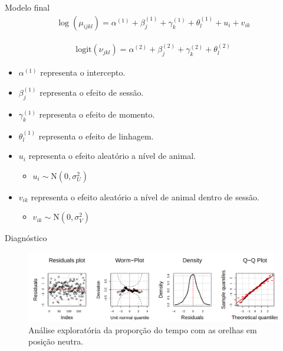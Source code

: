 \documentclass[
  ignorenonframetext,
  serif,
  professionalfont,
  usenames,
  dvipsnames,
  aspectratio = 169]{beamer}
\providecommand{\tightlist}{%
  \setlength{\itemsep}{0pt}\setlength{\parskip}{0pt}}
\renewcommand{\tightlist}{%
  \setlength{\itemsep}{0\baselineskip}
  \setlength{\parskip}{0.25\baselineskip}
}
\begin{document}
\begin{frame}{Modelo final}
\protect\hypertarget{modelo-final-2}{}
\begin{equation}
    \begin{aligned}
        \log(\mu_{ijkl}) = \alpha^{(1)} + \beta_{j}^{(1)} + \gamma_{k}^{(1)} + \theta_{l}^{(1)} + u_{i} + v_{ik}
    \end{aligned}
    \label{eq.count.mu}
\end{equation}

\begin{equation}
    \begin{aligned}
        \text{logit}(\nu_{jkl}) = \alpha^{(2)} + \beta_{j}^{(2)} + \gamma_{k}^{(2)} + \theta_{l}^{(2)}
    \end{aligned}
    \label{eq.count.nu}
\end{equation}

\begin{itemize}
\item
  \(\alpha^{(1)}\) representa o intercepto.
\item
  \(\beta_{j}^{(1)}\) representa o efeito de sessão.
\item
  \(\gamma_{k}^{(1)}\) representa o efeito de momento.
\item
  \(\theta_{l}^{(1)}\) representa o efeito de linhagem.
\item
  \(u_{i}\) representa o efeito aleatório a nível de animal.

  \begin{itemize}
  \tightlist
  \item
    \(u_{i} \sim \text{N}(0, \sigma^{2}_{U})\)
  \end{itemize}
\item
  \(v_{ik}\) representa o efeito aleatório a nível de animal dentro de
  sessão.

  \begin{itemize}
  \tightlist
  \item
    \(v_{ik} \sim \text{N}(0, \sigma^{2}_{V})\)
  \end{itemize}
\end{itemize}
\end{frame}

\begin{frame}{Diagnóstico}
\protect\hypertarget{diagnuxf3stico}{}
\begin{figure}

{\centering \includegraphics[width=0.95\linewidth]{./img/mzanbi} 

}

\caption{Análise exploratória da proporção do tempo com as orelhas em posição neutra.}\label{fig:unnamed-chunk-11}
\end{figure}
\end{frame}
\end{document}
